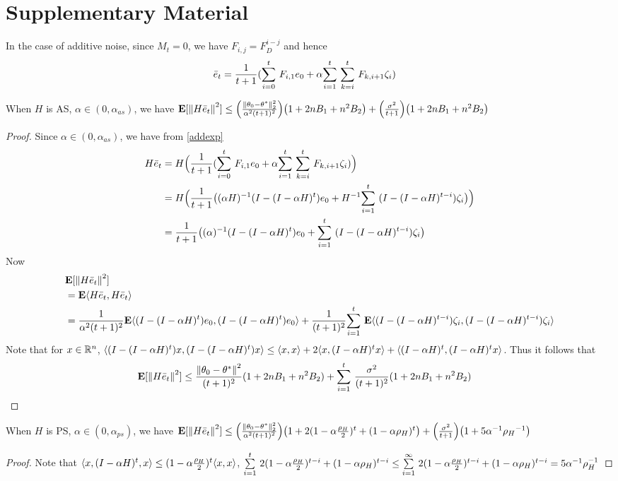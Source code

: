 \onecolumn
\section{Supplementary Material}
In the case of additive noise, since $M_t=0$, we have $F_{i,j}=F^{i-j}_D$ and hence
\begin{align}\label{addexp}
\eb_t&=\frac{1}{t+1}(\ous{\sum}{i=0}{t} F_{i,1} e_0+ \alpha\ous{\sum}{i=1}{t} \ous{\sum}{k=i}{t} F_{k,i+1}  \zeta_i )
\end{align}
\begin{theorem}
When $H$ is AS, $\alpha \in (0,\alpha_{as})$, we have
$\E[\norm{H\eb_t}^2]\leq \Big(\frac{\norm{\theta_0-\ts}^2_2}{\alpha^2(t+1)^2}\Big)\big(1+2nB_1+n^2B_2\big)+\Big(\frac{\sigma^2}{t+1}\Big)\big(1+2nB_1+n^2B_2\big)$
\end{theorem}
\begin{proof}
Since $\alpha\in (0,\alpha_{as})$, we have from \eqref{addexp}
\begin{align*}
H\eb_t&=H\Big(\frac{1}{t+1}(\ous{\sum}{i=0}{t} F_{i,1} e_0+ \alpha\ous{\sum}{i=1}{t} \ous{\sum}{k=i}{t} F_{k,i+1}  \zeta_i )\Big)\\
&=H\Big(\frac{1}{t+1}\big((\alpha H)^{-1}(I-(I-\alpha H)^t)e_0+ H^{-1}\ous{\sum}{i=1}{t}(I-(I-\alpha H)^{t-i}) \zeta_i\big)\Big)\\
&=\frac{1}{t+1}\big((\alpha)^{-1}(I-(I-\alpha H)^t)e_0+ \ous{\sum}{i=1}{t}(I-(I-\alpha H)^{t-i}) \zeta_i\big)
\end{align*}
Now
\begin{align*}
&\E[\norm{H\eb_t}^2]\\
&=\E\ip{H\eb_t,H\eb_t}\\
&=\frac{1}{\alpha^2(t+1)^2}\E\ip{(I-(I-\alpha H)^t)e_0,(I-(I-\alpha H)^t)e_0}+\frac{1}{(t+1)^2}\ous{\sum}{i=1}{t}\E\ip{(I-(I-\alpha H)^{t-i}) \zeta_i,(I-(I-\alpha H)^{t-i}) \zeta_i}
\end{align*}
Note that for $x\in \R^n$, $\ip{(I-(I-\alpha H)^t)x,(I-(I-\alpha H)^t)x}\leq \ip{x,x}+2\ip{x,(I-\alpha H)^tx}+\ip{(I-\alpha H)^t,(I-\alpha H)^t x}$. Thus it follows that
\begin{align*}
&\E[\norm{H\eb_t}^2]\leq \frac{\norm{\theta_0-\ts}^2}{(t+1)^2} (1+2nB_1+n^2B_2)+\ous{\sum}{i=1}{t}\frac{\sigma^2}{(t+1)^2}(1+2nB_1+n^2B_2)
\end{align*}
\end{proof}


\begin{theorem}
When $H$ is PS, $\alpha \in (0,\alpha_{ps})$, we have
$\E[\norm{H\eb_t}^2]\leq \Big(\frac{\norm{\theta_0-\ts}^2_2}{\alpha^2(t+1)^2}\Big)\big(1+2(1-\alpha\frac{\rho_H}{2})^t+(1-\alpha\rho_H)^t\big)+\Big(\frac{\sigma^2}{t+1}\Big)\big(1+5\alpha^{-1}{\rho_H}^{-1}\big)$
\end{theorem}
\begin{proof}
Note that $\ip{x,(I-\alpha H)^t,x}\leq (1-\alpha\frac{\rho_H}{2})^t \ip{x,x}$, $\ous{\sum}{i=1}{t} 2 (1-\alpha \frac{\rho_H}{2})^{t-i}+(1-\alpha {\rho_H})^{t-i}\leq \ous{\sum}{i=1}{\infty} 2 (1-\alpha \frac{\rho_H}{2})^{t-i}+(1-\alpha {\rho_H})^{t-i}=5\alpha^{-1}\rho_H^{-1}$
\end{proof}


